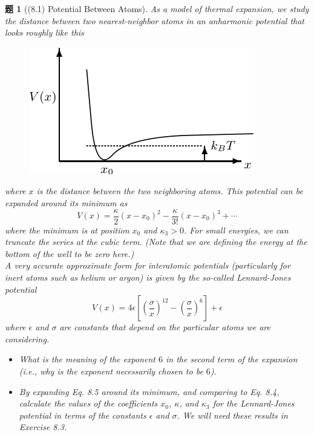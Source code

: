 \documentclass[UTF8,10pt,a4paper]{article}
\theoremstyle{Problem}
\newtheorem{prob}{题}
\theoremstyle{Solution}
\begin{document}
\thispagestyle{FirstPageStyle}
\begin{prob}[(8.1) Potential Between Atoms]
    As a model of thermal expansion, we study the distance between two nearest-neighbor atoms in an anharmonic potential that looks roughly like this
    \begin{figure}[h]
        \centering
        \includegraphics[width=.32\textwidth]{1.png}
    \end{figure}
    where $x$ is the distance between the two neighboring atoms. This potential can be expanded around its minimum as
    \[
        V(x)=\frac{\kappa}{2}(x-x_0)^2-\frac{\kappa}{3!}(x-x_0)^3+\cdots\tag{8.4}
    \]
    where the minimum is at position $x_0$ and $\kappa_3>0$. For small energies, we can truncate the series at the cubic term. (Note that we are defining the energy at the bottom of the well to be zero here.)\\
    A very accurate approximate form for interatomic potentials (particularly for inert atoms such as helium or argon) is given by the so-called Lennard-Jones potential
    \[
        V(x)=4\epsilon\left[\left(\frac{\sigma}{x}\right)^{12}-\left(\frac{\sigma}{x}\right)^6\right]+\epsilon\tag{8.5}
    \]
    where $\epsilon$ and $\sigma$ are constants that depend on the particular atoms we are considering.
    \begin{itemize}
        \item[$\triangleright$] What is the meaning of the exponent $6$ in the second term of the expansion (i.e., why is the exponent necessarily chosen to be $6$).
        \item[$\triangleright$] By expanding Eq. 8.5 around its minimum, and comparing to Eq. 8.4, calculate the values of the coefficients $x_0$, $\kappa$, and $\kappa_3$ for the Lennard-Jones potential in terms of the constants $\epsilon$ and $\sigma$. We will need these results in Exercise 8.3.
    \end{itemize}
\end{prob}
\end{document}
